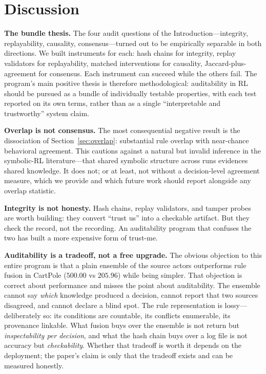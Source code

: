 \documentclass[11pt]{article}
\begin{document}
\section{Discussion}
\label{sec:discussion}

\textbf{The bundle thesis.} The four audit questions of the Introduction---integrity, replayability, causality, consensus---turned out to be empirically separable in both directions. We built instruments for each: hash chains for integrity, replay validators for replayability, matched interventions for causality, Jaccard-plus-agreement for consensus. Each instrument can succeed while the others fail. The program's main positive thesis is therefore methodological: auditability in RL should be pursued as a bundle of individually testable properties, with each test reported on its own terms, rather than as a single ``interpretable and trustworthy'' system claim.

\textbf{Overlap is not consensus.} The most consequential negative result is the dissociation of Section~\ref{sec:overlap}: substantial rule overlap with near-chance behavioral agreement. This cautions against a natural but invalid inference in the symbolic-RL literature---that shared symbolic structure across runs evidences shared knowledge. It does not; or at least, not without a decision-level agreement measure, which we provide and which future work should report alongside any overlap statistic.

\textbf{Integrity is not honesty.} Hash chains, replay validators, and tamper probes are worth building: they convert ``trust us'' into a checkable artifact. But they check the record, not the recording. An auditability program that confuses the two has built a more expensive form of trust-me.

\textbf{Auditability is a tradeoff, not a free upgrade.} The obvious objection to this entire program is that a plain ensemble of the source actors outperforms rule fusion in CartPole ($500.00$ vs $205.96$) while being simpler. That objection is correct about performance and misses the point about auditability. The ensemble cannot say \textit{which} knowledge produced a decision, cannot report that two sources disagreed, and cannot declare a blind spot. The rule representation is lossy---deliberately so: its conditions are countable, its conflicts enumerable, its provenance linkable. What fusion buys over the ensemble is not return but \textit{inspectability per decision}, and what the hash chain buys over a log file is not accuracy but \textit{checkability}. Whether that tradeoff is worth it depends on the deployment; the paper's claim is only that the tradeoff exists and can be measured honestly.
\end{document}
